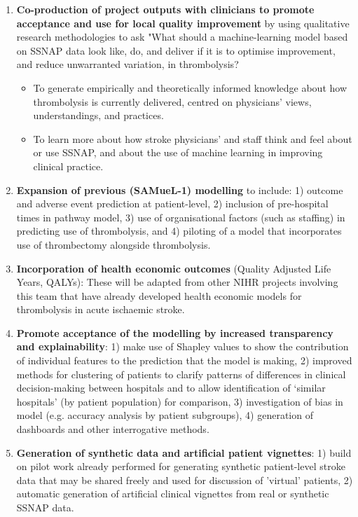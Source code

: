 \begin{enumerate}

    \item \textbf{Co-production of project outputs with clinicians to promote acceptance and use for local quality improvement} by using qualitative research methodologies to ask "What should a machine-learning model based on SSNAP data look like, do, and deliver if it is to optimise improvement, and reduce unwarranted variation, in thrombolysis?

    \begin{itemize}
        \item To generate empirically and theoretically informed knowledge about how thrombolysis is currently delivered, centred on physicians’ views, understandings, and practices.
        \item To learn more about how stroke physicians’ and staff think and feel about or use SSNAP, and about the use of machine learning in improving clinical practice.
    \end{itemize}  

    \item \textbf{Expansion of previous (SAMueL-1) modelling} to include: 1) outcome and adverse event prediction at patient-level, 2) inclusion of pre-hospital times in pathway model, 3) use of organisational factors (such as staffing) in predicting use of thrombolysis, and 4) piloting of a model that incorporates use of thrombectomy alongside thrombolysis.

    \item \textbf{Incorporation of health economic outcomes} (Quality Adjusted Life Years, QALYs): These will be adapted from other NIHR projects involving this team that have already developed health economic models for thrombolysis in acute ischaemic stroke.

    \item \textbf{Promote acceptance of the modelling by increased transparency and explainability}: 1) make use of Shapley values to show the contribution of individual features to the prediction that the model is making, 2) improved methods for clustering of patients to clarify patterns of differences in clinical decision-making between hospitals and to allow identification of ‘similar hospitals’ (by patient population) for comparison, 3) investigation of bias in model (e.g. accuracy analysis by patient subgroups), 4) generation of dashboards and other interrogative methods.

    \item \textbf{Generation of synthetic data and artificial patient vignettes}: 1) build on pilot work already performed for generating synthetic patient-level stroke data that may be shared freely and used for discussion of ’virtual’ patients, 2) automatic generation of artificial clinical vignettes from real or synthetic SSNAP data.


    
\end{enumerate}